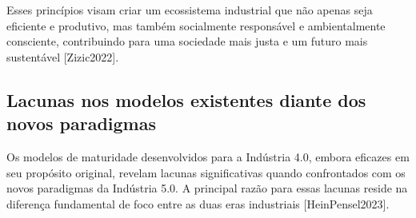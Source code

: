 Esses princípios visam criar um ecossistema industrial que não apenas seja eficiente e produtivo, mas também socialmente responsável e ambientalmente consciente, contribuindo para uma sociedade mais justa e um futuro mais sustentável [Zizic2022].

\subsection{Lacunas nos modelos existentes diante dos novos paradigmas}

Os modelos de maturidade desenvolvidos para a Indústria 4.0, embora eficazes em seu propósito original, revelam lacunas significativas quando confrontados com os novos paradigmas da Indústria 5.0. A principal razão para essas lacunas reside na diferença fundamental de foco entre as duas eras industriais [HeinPensel2023].

